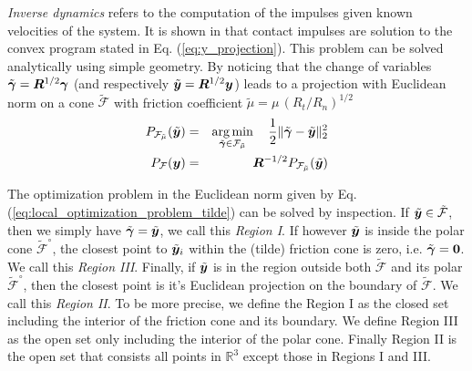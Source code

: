 \textit{Inverse dynamics} refers to the computation of the impulses given known
velocities of the system. It is shown in \cite{bib:todorov2014} that contact
impulses are solution to the convex program stated in Eq.
(\ref{eq:y_projection}). This problem can be solved analytically using simple
geometry. By noticing that the change of variables
$\tilde{{\bm\gamma}}={\bm{R}}^{1/2}{\bm\gamma}$ (and respectively
$\tilde{{\bm{y}}}={\bm{R}}^{1/2}{\bm{y}}$) leads to a projection with Euclidean norm
on a cone $\tilde{\mathcal{F}}$ with friction coefficient
$\tilde\mu=\mu\,(R_t/R_n)^{1/2}$
\begin{eqnarray}
	P_\mathcal{F_{\tilde\mu}}(\tilde{\vf{y}})&=&\argmin_{\tilde\bgamma\in\mathcal{F_{\tilde\mu}}}
		\quad \frac{1}{2}\Vert\tilde\bgamma-\tilde{\vf{y}}\Vert_2^2\nonumber\\
	P_\mathcal{F}(\vf{y}) &=&
	\vf{R}^{-1/2}P_\mathcal{F_{\tilde\mu}}(\tilde{\vf{y}})
	\label{eq:local_optimization_problem_tilde}
\end{eqnarray}

The optimization problem in the Euclidean norm given by Eq.
(\ref{eq:local_optimization_problem_tilde}) can be solved by inspection. If
$\tilde{{\bm{y}}}\in\tilde{\mathcal{F}}$, then we simply have $\tilde{{\bm\gamma}}
= \tilde{{\bm{y}}}$, we call this \textit{Region I}. If however $\tilde{{\bm{y}}}$
is inside the polar cone $\tilde{\mathcal{F}}^\circ$, the closest point to
$\tilde{{\bm{y}}}_i$ within the (tilde) friction cone is zero, i.e.
$\tilde{{\bm\gamma}} ={\bm{0}}$. We call this \textit{Region III}. Finally, if
$\tilde{{\bm{y}}}$ is in the region outside both $\tilde{\mathcal{F}}$ and its
polar $\tilde{\mathcal{F}}^\circ$, then the closest point is it's Euclidean
projection on the boundary of $\tilde{\mathcal{F}}$. We call this
\textit{Region II}. To be more precise, we define the Region I as the closed set
including the interior of the friction cone and its boundary. We define Region
III as the open set only including the interior of the polar cone. Finally
Region II is the open set that consists all points in $\mathbb{R}^3$ except
those in Regions I and III.

